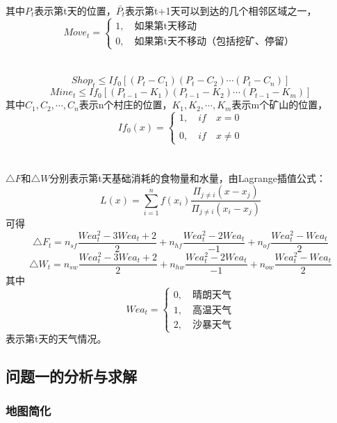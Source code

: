 \documentclass[withoutpre]{cumcmthesis} %
\begin{document}
其中$P_t$表示第t天的位置，$\bar{P_t}$表示第t+1天可以到达的几个相邻区域之一，
$$Move_t=\begin{cases}
1,\quad \text{如果第t天移动}\\
0,\quad \text{如果第t天不移动（包括挖矿、停留）}
\end{cases}$$\\\\
\begin{equation}
Shop_t\leqslant If_0[(P_t-C_1)(P_t-C_2)\cdots(P_t-C_n)]
\end{equation}
\begin{equation}
Mine_t\leqslant If_0[(P_{t-1}-K_1)(P_{t-1}-K_2)\cdots(P_{t-1}-K_m)]
\end{equation}其中$C_1,C_2,\cdots,C_n$表示n个村庄的位置，$K_1,K_2,\cdots,K_m$表示m个矿山的位置，
$$If_0(x)=\begin{cases}
1,\quad if\quad x=0\\\\
0,\quad if\quad x\neq0
\end{cases}$$\\\\

$\triangle F$和$\triangle W$分别表示第t天基础消耗的食物量和水量，由Lagrange插值公式：
$$L(x)=\sum_{i=1}^nf(x_i)\displaystyle\frac{\Pi_{j\neq i}(x-x_j)}{\Pi_{j\neq i}(x_i-x_j)}$$
可得
\begin{equation}
\triangle F_t=n_{sf}\frac{Wea_t^2-3Wea_t+2}{2}+n_{hf}\frac{Wea_t^2-2Wea_t}{-1}+n_{of}\frac{Wea_t^2-Wea_t}{2}
\end{equation}
\begin{equation}
\triangle W_t=n_{sw}\frac{Wea_t^2-3Wea_t+2}{2}+n_{hw}\frac{Wea_t^2-2Wea_t}{-1}+n_{ow}\frac{Wea_t^2-Wea_t}{2}
\end{equation}
其中$$Wea_t=\begin{cases}
0,\quad\text{晴朗天气}\\
1,\quad\text{高温天气}\\
2,\quad\text{沙暴天气}
\end{cases}$$表示第t天的天气情况。


\subsection{问题一的分析与求解}
\subsubsection{地图简化}
\end{document}
